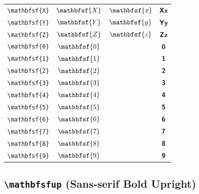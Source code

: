 \documentclass[12pt,a4paper]{article}
\begin{document}
\begin{longtable}{|c|c|c|c|}
\verb|\mathbfsf{X}| & $\mathbfsf{X}$ & $\mathbfsf{x}$ & $ 𝗫 𝘅 $ \\
\verb|\mathbfsf{Y}| & $\mathbfsf{Y}$ & $\mathbfsf{y}$ & $ 𝗬 𝘆 $ \\
\verb|\mathbfsf{Z}| & $\mathbfsf{Z}$ & $\mathbfsf{z}$ & $ 𝗭 𝘇 $ \\
\verb|\mathbfsf{0}| & $\mathbfsf{0}$ & & $ 𝟬 $ \\
\verb|\mathbfsf{1}| & $\mathbfsf{1}$ & & $ 𝟭 $ \\
\verb|\mathbfsf{2}| & $\mathbfsf{2}$ & & $ 𝟮 $ \\
\verb|\mathbfsf{3}| & $\mathbfsf{3}$ & & $ 𝟯 $ \\
\verb|\mathbfsf{4}| & $\mathbfsf{4}$ & & $ 𝟰 $ \\
\verb|\mathbfsf{5}| & $\mathbfsf{5}$ & & $ 𝟱 $ \\
\verb|\mathbfsf{6}| & $\mathbfsf{6}$ & & $ 𝟲 $ \\
\verb|\mathbfsf{7}| & $\mathbfsf{7}$ & & $ 𝟳 $ \\
\verb|\mathbfsf{8}| & $\mathbfsf{8}$ & & $ 𝟴 $ \\
\verb|\mathbfsf{9}| & $\mathbfsf{9}$ & & $ 𝟵 $ \\
\hline
\end{longtable}

\newpage

\subsection*{\texttt{\textbackslash{}mathbfsfup} (Sans-serif Bold Upright)}
\end{document}

